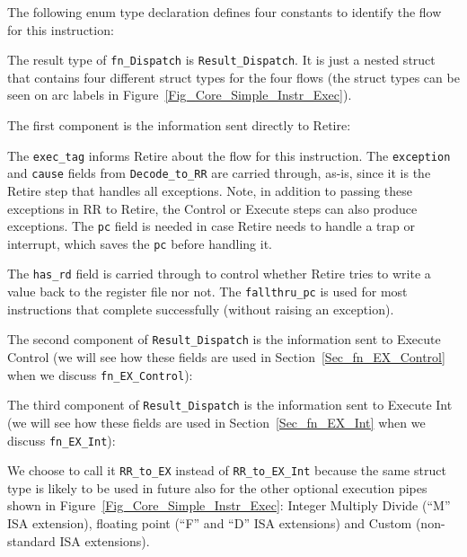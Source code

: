 The following enum type declaration defines four constants to identify
the flow for this instruction:



The result type of \verb|fn_Dispatch| is \verb|Result_Dispatch|.  It
is just a nested struct that contains four different struct types for
the four flows (the struct types can be seen on arc labels in
Figure~\ref{Fig_Core_Simple_Instr_Exec}).



The first component is the information sent directly to Retire:



The \verb|exec_tag| informs Retire about the flow for this
instruction.  The {\tt exception} and {\tt cause} fields from
\verb|Decode_to_RR| are carried through, as-is, since it is the Retire
step that handles all exceptions.  Note, in addition to passing these
exceptions in RR to Retire, the Control or Execute steps can also
produce exceptions.  The {\tt pc} field is needed in case Retire needs
to handle a trap or interrupt, which saves the {\tt pc} before
handling it.

The \verb|has_rd| field is carried through to control whether Retire
tries to write a value back to the register file nor not.  The
\verb|fallthru_pc| is used for most instructions that complete
successfully (without raising an exception).

The second component of \verb|Result_Dispatch| is the information sent
to Execute Control (we will see how these fields are used in
Section~\ref{Sec_fn_EX_Control} when we discuss \verb|fn_EX_Control|):



The third component of \verb|Result_Dispatch| is the information sent
to Execute Int (we will see how these fields are used in
Section~\ref{Sec_fn_EX_Int} when we discuss \verb|fn_EX_Int|):



We choose to call it \verb|RR_to_EX| instead of \verb|RR_to_EX_Int|
because the same struct type is likely to be used in future also for
the other optional execution pipes shown in
Figure~\ref{Fig_Core_Simple_Instr_Exec}: Integer Multiply Divide
(``M'' ISA extension), floating point (``F'' and ``D'' ISA extensions)
and Custom (non-standard ISA extensions).

